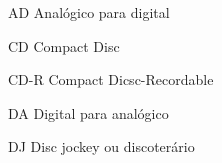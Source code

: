 \begin{siglas}

\item[AD] Analógico para digital
\item[CD] Compact Disc
\item[CD-R] Compact Dicsc-Recordable
\item[DA] Digital para analógico
\item[DJ] Disc jockey ou discoterário

\end{siglas}
